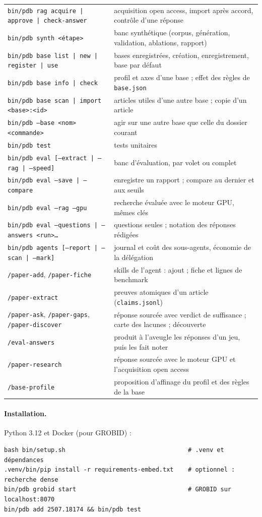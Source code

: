 \documentclass[11pt,a4paper]{article}
\newcommand{\cmd}[1]{\texttt{#1}}
\begin{document}
\begin{center}
\begin{tabularx}{\linewidth}{@{}lL@{}}
\cmd{bin/pdb rag acquire | approve | check-answer} & acquisition open access, import après accord, contrôle d'une réponse \\
\cmd{bin/pdb synth <étape>} & banc synthétique (corpus, génération, validation, ablations, rapport) \\
\cmd{bin/pdb base list | new | register | use} & bases enregistrées, création, enregistrement, base par défaut \\
\cmd{bin/pdb base info | check} & profil et axes d'une base ; effet des règles de \cmd{base.json} \\
\cmd{bin/pdb base scan | import <base>:<id>} & articles utiles d'une autre base ; copie d'un article \\
\cmd{bin/pdb --base <nom> <commande>} & agir sur une autre base que celle du dossier courant \\
\cmd{bin/pdb test} & tests unitaires \\
\cmd{bin/pdb eval [--extract | --rag | --speed]} & banc d'évaluation, par volet ou complet \\
\cmd{bin/pdb eval --save | --compare} & enregistre un rapport ; compare au dernier et aux seuils \\
\cmd{bin/pdb eval --rag --gpu} & recherche évaluée avec le moteur GPU, mêmes clés \\
\cmd{bin/pdb eval --questions | --answers <run>…} & questions seules ; notation des réponses rédigées \\
\cmd{bin/pdb agents [--report | --scan | --mark]} & journal et coût des sous-agents, économie de la délégation \\
\midrule
\cmd{/paper-add}, \cmd{/paper-fiche} & skills de l'agent : ajout ; fiche et lignes de benchmark \\
\cmd{/paper-extract} & preuves atomiques d'un article (\cmd{claims.jsonl}) \\
\cmd{/paper-ask}, \cmd{/paper-gaps}, \cmd{/paper-discover} & réponse sourcée avec verdict de suffisance ; carte des lacunes ; découverte \\
\cmd{/eval-answers} & produit à l'aveugle les réponses d'un jeu, puis les fait noter \\
\cmd{/paper-research} & réponse sourcée avec le moteur GPU et l'acquisition open access \\
\cmd{/base-profile} & proposition d'affinage du profil et des règles de la base \\
\bottomrule
\end{tabularx}
\end{center}

\paragraph{Installation.} Python 3.12 et Docker (pour GROBID) :
\begin{lstlisting}
bash bin/setup.sh                                  # .venv et dépendances
.venv/bin/pip install -r requirements-embed.txt    # optionnel : recherche dense
bin/pdb grobid start                               # GROBID sur localhost:8070
bin/pdb add 2507.18174 && bin/pdb test
\end{lstlisting}
\end{document}
